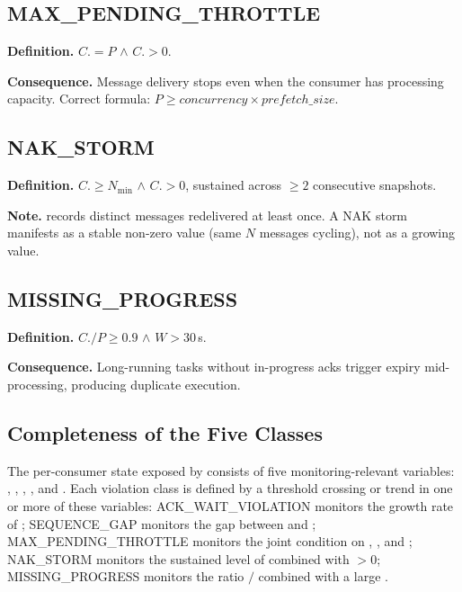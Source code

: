 \documentclass[sigconf,nonacm]{acmart}
\begin{document}
\subsection{MAX\_PENDING\_THROTTLE}

\textbf{Definition.} $C$.${=P}$ $\wedge$
$C$.${>0}$.

\textbf{Consequence.} Message delivery stops even when the consumer has
processing capacity. Correct formula: $P \geq \mathit{concurrency}
\times \mathit{prefetch\_size}$.

\subsection{NAK\_STORM}

\textbf{Definition.} $C$.${}\geq N_\mathrm{min}$
$\wedge$ $C$.${}>0$, sustained across $\geq 2$
consecutive snapshots.

\textbf{Note.}  records distinct messages redelivered
at least once. A NAK storm manifests as a stable non-zero value (same $N$
messages cycling), not as a growing value.

\subsection{MISSING\_PROGRESS}

\textbf{Definition.} $C$.${}/P \geq 0.9$
$\wedge$ $W > 30$\,s.

\textbf{Consequence.} Long-running tasks without in-progress acks trigger
 expiry mid-processing, producing duplicate execution.

\subsection{Completeness of the Five Classes}

The per-consumer state exposed by  consists
of five monitoring-relevant variables:
, , ,
, and .
Each violation class is defined by a threshold crossing or trend in one
or more of these variables:
ACK\_WAIT\_\allowbreak VIOLATION monitors the growth rate of ;
SEQUENCE\_GAP monitors the gap between  and
;
MAX\_PENDING\_\allowbreak THROTTLE monitors the joint condition on
, , and ;
NAK\_STORM monitors the sustained level of  combined
with ${}>0$;
MISSING\_PROGRESS monitors the ratio $/$
combined with a large .
\end{document}
